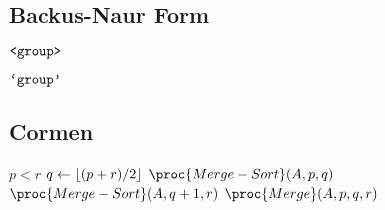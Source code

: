 \subsection{Backus-Naur Form}

\begin{description}[\setleftmargin{90pt}]

\item [\command{nonterm\{group\}}] $\text{{\ttfamily<group>}}$

\item [\command{term\{group\}}] $\text{{\ttfamily`group'}}$

\end{description}

\subsection{Cormen}

\begin{codebox}
\li \If $p < r$ \Then
\li $q \gets \left\lfloor{(p + r) / 2}\right\rfloor$
\li $\proc{Merge-Sort}(A, p, q)$
\li $\proc{Merge-Sort}(A, q + 1, r)$
\li $\proc{Merge}(A, p, q, r)$
\End
\end{codebox}
